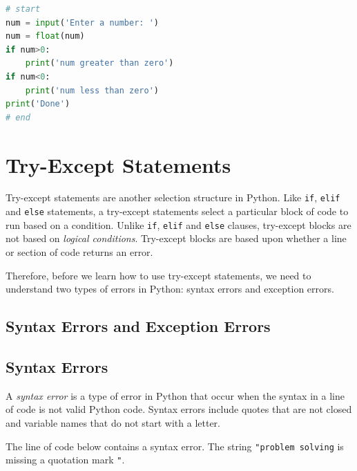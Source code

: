 \documentclass{book}
\begin{document}
\begin{lstlisting}[language=Python]
# start
num = input('Enter a number: ')
num = float(num)
if num>0:
    print('num greater than zero')
if num<0:
    print('num less than zero')
print('Done')
# end
\end{lstlisting}
    




    
        \section{Try-Except Statements}\label{try-except-statements}
    




    
        Try-except statements are another selection structure in Python. Like
\lstinline!if!, \lstinline!elif! and \lstinline!else! statements, a
try-except statements select a particular block of code to run based on
a condition. Unlike \lstinline!if!, \lstinline!elif! and
\lstinline!else! clauses, try-except blocks are not based on
\emph{logical conditions}. Try-except blocks are based upon whether a
line or section of code returns an error.

Therefore, before we learn how to use try-except statements, we need to
understand two types of errors in Python: syntax errors and exception
errors.
    




    
        \subsection{Syntax Errors and Exception
Errors}\label{syntax-errors-and-exception-errors}
    




    
        \subsection{Syntax Errors}\label{syntax-errors}

A \emph{syntax error} is a type of error in Python that occur when the
syntax in a line of code is not valid Python code. Syntax errors include
quotes that are not closed and variable names that do not start with a
letter.

The line of code below contains a syntax error. The string
\lstinline!"problem solving! is missing a quotation mark \lstinline!"!.
    
\end{document}
